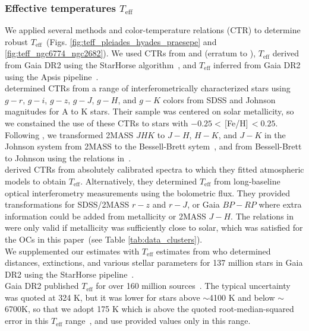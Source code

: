 \documentclass{aa}
\begin{document}
\subsubsection{Effective temperatures $T_\mathrm{eff}$}
We applied several methods and color-temperature relations (CTR) to determine robust $T_\mathrm{eff}$~(Figs. \ref{fig:teff_pleiades_hyades_praesepe} and \ref{fig:teff_ngc6774_ngc2682}). We used CTRs from \citet{boyajian_stellar_2013} and \citet{mann_erratum_2016} (erratum to \citealt{mann_how_2015}), $T_\mathrm{eff}$ derived from Gaia DR2 using the StarHorse algorithm~\citep{queiroz_starhorse_2018}, and $T_\mathrm{eff}$ inferred from Gaia DR2 using the Apsis pipeline~\citep{bailerjones_apsis_2013, andrae_gaiaapsis_2018}.
\\
\citet{boyajian_stellar_2013} determined CTRs from a range of interferometrically characterized stars using $g-r$, $g-i$, $g-z$, $g-J$, $g-H$, and $g-K$ colors from SDSS and Johnson magnitudes for A to K stars. Their sample was centered on solar metallicity, so we constained the use of these CTRs to stars with $-0.25<$\,[Fe/H]$\,<0.25$. Following \citet{boyajian_stellar_2013}, we transformed 2MASS $JHK$ to $J-H$, $H-K$, and $J-K$ in the Johnson system from 2MASS to the Bessell-Brett sytem~\citep{carpenter_color_2001}, and from Bessell-Brett to Johnson using the relations in~\citet{bessell_brett_1988}. 
\\
\citet{mann_how_2015} derived CTRs from absolutely calibrated spectra to which they fitted atmospheric models to obtain $T_\mathrm{eff}$. Alternatively, they determined $T_\mathrm{eff}$ from long-baseline optical interferometry measurements using the bolometric flux. They provided transformations for SDSS/2MASS $r-z$ and $r-J$, or Gaia $BP-RP$ where extra information could be added from metallicity or 2MASS $J-H$. The relations in \citet{mann_how_2015} were only valid if metallicity was sufficiently close to solar, which was satisfied for the OCs in this paper~(see Table \ref{tab:data_clusters}). 
\\
We supplemented our estimates with $T_\mathrm{eff}$ estimates from \citet{anders_starhorse_2019} who determined distances, extinctions, and various stellar parameters for 137 million stars in Gaia DR2 using the StarHorse pipeline~\citep{queiroz_starhorse_2018}.
\\
Gaia DR2 published $T_\mathrm{eff}$ for over 160 million sources~\citep{gaia2018}. The typical uncertainty was quoted at 324 K, but it was lower for stars above $\sim$4100 K and below $\sim$6700K, so that we adopt 175 K which is above the quoted root-median-squared error in this $T_\mathrm{eff}$ range~\citep{andrae_gaiaapsis_2018}, and use provided values only in this range.
\end{document}
